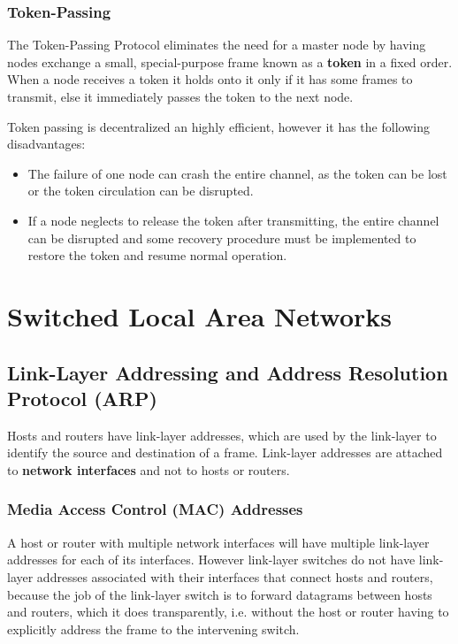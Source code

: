 \documentclass[12pt letter]{report}
\begin{document}
\subsection{Token-Passing}

The Token-Passing Protocol eliminates the need for a master node by
having nodes exchange a small, special-purpose frame known as a
\textbf{token} in a fixed order. When a node receives a token it
holds onto it only if it has some frames to transmit, else it
immediately passes the token to the next node.

Token passing is decentralized an highly efficient, however it has
the following disadvantages:
\begin{itemize}
  \item The failure of one node can crash the entire channel, as the
    token can be lost or the token circulation can be disrupted.
  \item If a node neglects to release the token after transmitting,
    the entire channel can be disrupted and some recovery procedure
    must be implemented to restore the token and resume normal operation.
\end{itemize}

\chapter{Switched Local Area Networks}

\section{Link-Layer Addressing and Address Resolution Protocol (ARP)}

Hosts and routers have link-layer addresses, which are used by the
link-layer to identify
the source and destination of a frame. Link-layer addresses are
attached to \textbf{network interfaces} and not to hosts or routers.

\subsection{Media Access Control (MAC) Addresses}

A host or router with multiple network interfaces will have multiple
link-layer addresses for each of its interfaces. However link-layer
switches do not have link-layer addresses associated with their
interfaces that connect hosts and routers, because the job of the
link-layer switch is to forward datagrams between hosts and routers,
which it does transparently, i.e. without the host or router having
to explicitly address the frame to the intervening switch.
\end{document}
